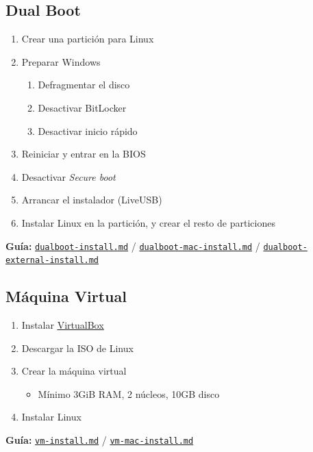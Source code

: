 \documentclass[aspectratio=43]{beamer}
\begin{document}
    \subsection{Dual Boot}
     \begin{frame}[fragile]{\subsecname}{}
        \begin{enumerate}
            \item Crear una partición para Linux
            \item Preparar Windows
            \begin{enumerate}
                \item Defragmentar el disco
                \item Desactivar BitLocker
                \item Desactivar inicio rápido
            \end{enumerate}
            \item Reiniciar y entrar en la BIOS
            \item Desactivar \textit{Secure boot}
            \item Arrancar el instalador (LiveUSB)
            \item Instalar Linux en la partición, y crear el resto de particiones
        \end{enumerate}
        \bigskip
        \textbf{Guía:} \href{https://github.com/guluc3m/linux404/blob/main/dualboot-install.md}{\underline{}\texttt{dualboot-install.md}} / \href{https://github.com/guluc3m/linux404/blob/main/dualboot-mac-install.md}{\underline{}\texttt{dualboot-mac-install.md}} / \href{https://github.com/guluc3m/linux404/blob/main/dualboot-external-install.md}{\underline{}\texttt{dualboot-external-install.md}}
    \end{frame}

    \subsection{Máquina Virtual}
    \begin{frame}[fragile]{\subsecname}{}
        \begin{enumerate}
            \item Instalar \href{https://www.virtualbox.org/}{\underline{VirtualBox}}
            \item Descargar la ISO de Linux
            \item Crear la máquina virtual
            \begin{itemize}
                \item Mínimo 3GiB RAM, 2 núcleos, 10GB disco
            \end{itemize}
            \item Instalar Linux
        \end{enumerate}
        \bigskip
        \textbf{Guía:} \href{https://github.com/guluc3m/linux404/blob/main/vm-install.md}{\underline{}\texttt{vm-install.md}} / \href{https://github.com/guluc3m/linux404/blob/main/vm-mac-install.md}{\underline{}\texttt{vm-mac-install.md}}
    \end{frame}
\end{document}
